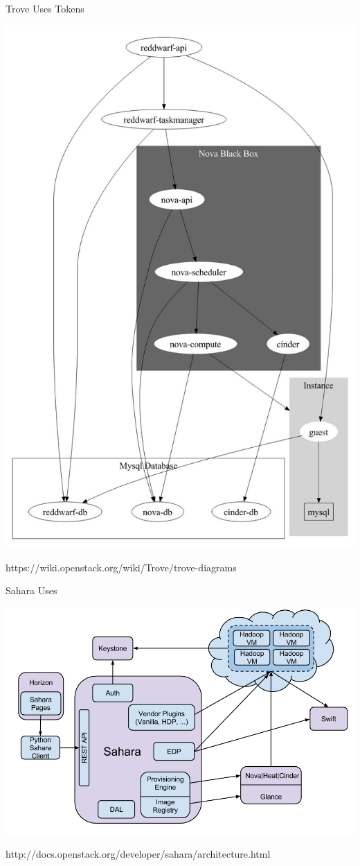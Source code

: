 \documentclass{beamer}
\begin{document}
\begin{frame}{Trove Uses Tokens}
  \begin{block}{}
    \includegraphics[scale=0.2]{Reddwarf-overview.jpeg}
  \end{block}
  https://wiki.openstack.org/wiki/Trove/trove-diagrams
\end {frame}

\begin{frame}{Sahara Uses}
  \begin{block}{}
    \includegraphics[scale=0.3]{sahara-architecture.png}
  \end{block}
  http://docs.openstack.org/developer/sahara/architecture.html
\end {frame}
\end{document}
